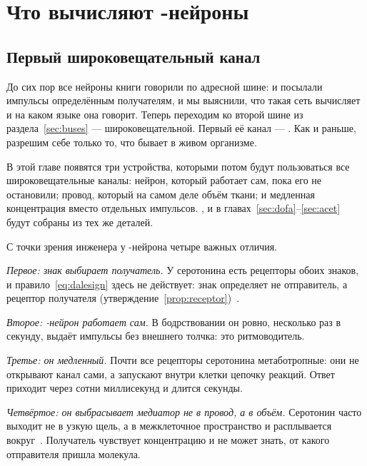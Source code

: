 \chapter{Что вычисляют -нейроны}
\label{sec:serocomputer}

\section{Первый широковещательный канал}

До сих пор все нейроны книги говорили по адресной шине:  и  посылали импульсы определённым получателям, и мы выяснили, что такая сеть вычисляет и на каком языке она говорит. Теперь переходим ко второй шине из раздела~\ref{sec:buses} --- широковещательной. Первый её канал --- . Как и раньше, разрешим себе только то, что бывает в живом организме.

В этой главе появятся три устройства, которыми потом будут пользоваться все широковещательные каналы: нейрон, который работает сам, пока его не остановили; провод, который на самом деле объём ткани; и медленная концентрация вместо отдельных импульсов. ,  и  в главах~\ref{sec:dofa}--\ref{sec:acet} будут собраны из тех же деталей.

С точки зрения инженера у -нейрона четыре важных отличия.

\emph{Первое: знак выбирает получатель.} У серотонина есть рецепторы обоих знаков, и правило~\eqref{eq:dalesign} здесь не действует: знак определяет не отправитель, а рецептор получателя (утверждение~\ref{prop:receptor})~\cite{BarnesSharp1999}.

\emph{Второе: -нейрон работает сам.} В бодрствовании он ровно, несколько раз в секунду, выдаёт импульсы без внешнего толчка: это ритмоводитель.

\emph{Третье: он медленный.} Почти все рецепторы серотонина метаботропные: они не открывают канал сами, а запускают внутри клетки цепочку реакций. Ответ приходит через сотни миллисекунд и длится секунды.

\emph{Четвёртое: он выбрасывает медиатор не в провод, а в объём.} Серотонин часто выходит не в узкую щель, а в межклеточное пространство и расплывается вокруг~\cite{Bunin1998}. Получатель чувствует концентрацию и не может знать, от какого отправителя пришла молекула.

